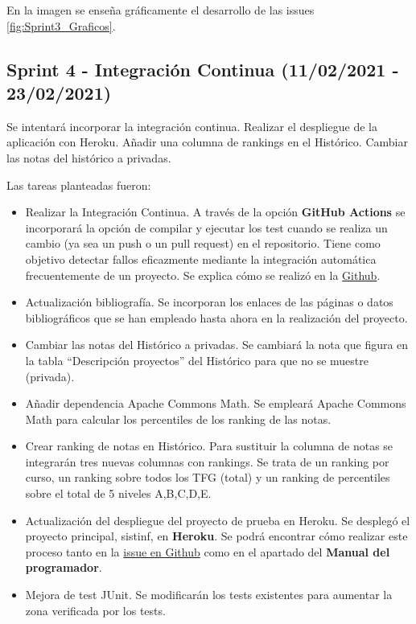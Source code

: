 En la imagen se enseña gráficamente el desarrollo de las issues \ref{fig:Sprint3_Graficos}.


\subsection{Sprint 4 - Integración Continua (11/02/2021 - 23/02/2021)}
Se intentará incorporar la integración continua. Realizar el despliegue de la aplicación con Heroku. Añadir una columna de rankings en el Histórico. Cambiar las notas del histórico a privadas.

Las tareas planteadas fueron:
\begin{itemize}
	\item Realizar la Integración Continua.
		A través de la opción \textbf{GitHub Actions} se incorporará la opción de compilar y ejecutar los test cuando se realiza un cambio (ya sea un push o un pull request) en el repositorio. Tiene como objetivo detectar fallos eficazmente mediante la integración automática frecuentemente de un proyecto. Se explica cómo se realizó en la \href{https://github.com/dbo1001/Gestor-TFG-2021/issues/37}{Github}.
	\item Actualización bibliografía. 
		Se incorporan los enlaces de las páginas o datos bibliográficos que se han empleado hasta ahora en la realización del proyecto.
	\item Cambiar las notas del Histórico a privadas. 
		Se cambiará la nota que figura en la tabla ``Descripción proyectos'' del Histórico para que no se muestre (privada).
	\item Añadir dependencia Apache Commons Math. 
		Se empleará Apache Commons Math para calcular los percentiles de los ranking de las notas.
	\item Crear ranking de notas en Histórico. 
		Para sustituir la columna de notas se integrarán tres nuevas columnas con rankings. Se trata de un ranking por curso, un ranking sobre todos los TFG (total) y un ranking de percentiles sobre el total de 5 niveles A,B,C,D,E.
	\item Actualización del despliegue del proyecto de prueba en Heroku. 
		Se desplegó el proyecto principal, sistinf, en \textbf{Heroku}. Se podrá encontrar cómo realizar este proceso tanto en la \href{https://github.com/dbo1001/Gestor-TFG-2021/issues/36}{issue en Github} como en el apartado del \textbf{Manual del programador}.
	\item Mejora de test JUnit. 
		Se modificarán los tests existentes para aumentar la zona verificada por los tests.
	
\end{itemize}

